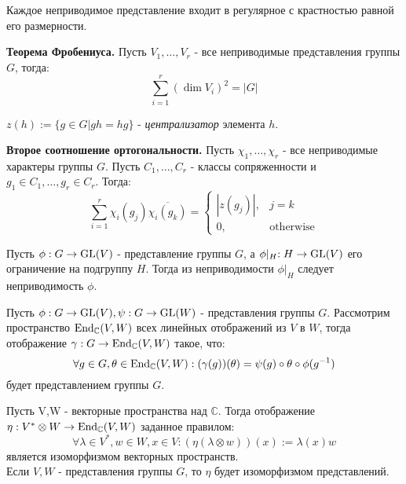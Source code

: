 \begin{ass}
Каждое неприводимое представление входит в регулярное с крастностью равной его размерности.
\end{ass}

\begin{thm}
\textbf{Теорема Фробениуса.} Пусть $V_1,\ldots,V_r$ - все неприводимые представления группы $G$, тогда:
$$\sum_{i=1}^r(\dim V_i)^2 = |G|$$
\end{thm}

\begin{defi}
$z(h):=\{ g\in G | gh=hg\}$ - \textit{централизатор} элемента $h$.
\end{defi}

\begin{thm}
\textbf{Второе соотношение ортогональности.} Пусть $\chi_1,\ldots,\chi_r$ - все неприводимые характеры группы $G$. Пусть $C_1,\ldots,C_r$ - классы сопряженности и $g_1\in C_1,\ldots,g_r\in C_r$. Тогда:
\begin{equation*}
\sum_{i=1}^r\chi_i(g_j)\overline{\chi_i(g_k)} =
 \begin{cases}
   |z(g_j)|, & j=k\\
   0, &\text{otherwise}
 \end{cases}
\end{equation*}
\end{thm}

\begin{ass}
Пусть ${\phi:G\to\operatorname{GL}(V)}$ - представление группы $G$, а ${\phi\lvert_H:H\to\operatorname{GL}(V)}$ его ограничение на подгруппу $H$. Тогда из неприводимости ${\phi\lvert_H}$ следует неприводимость ${\phi}$.
\end{ass}

\begin{ass}
Пусть $\phi:G\to\operatorname{GL}(V),\psi:G\to\operatorname{GL}(W)$ - представления группы $G$. Рассмотрим пространство $\operatorname{End}_{\mathbb{C}}(V,W)$ всех линейных отображений из $V$ в $W$, тогда отображение $\gamma:G\to\operatorname{End}_{\mathbb{C}}(V,W)$ такое, что:
$$\forall g\in G,\theta\in \operatorname{End}_{\mathbb{C}}(V,W): (\gamma(g))(\theta) = \psi(g)\circ\theta\circ\phi(g^{-1})$$
будет представлением группы $G$.
\end{ass}

\begin{ass}
Пусть V,W - векторные пространства над $\mathbb{C}$. Тогда отображение ${\eta:V^{*}\otimes W\to\operatorname{End}_{\mathbb{C}}(V,W)}$ заданное правилом: $$\forall \lambda\in V^{*},w\in W,x\in V:(\eta(\lambda\otimes w))(x):=\lambda(x)w$$
является изоморфизмом векторных пространств.\\ Если $V,W$ - представления группы $G$, то $\eta$ будет изоморфизмом представлений.
\end{ass}

